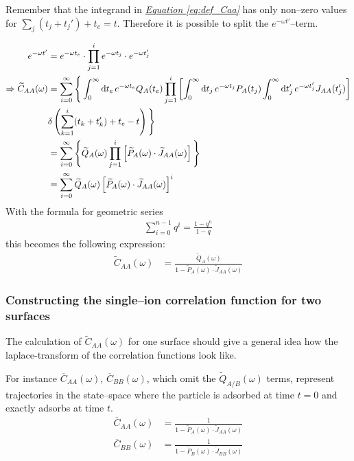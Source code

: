 \documentclass[a4paper, parskip=half]{scrartcl}
\newcommand{\diff}{\mathop{}\!\mathrm{d}}
\newcommand{\myEqRef}[1]{\textit{\hyperref[eq:#1]{Equation \ref*{eq:#1}}}}
\begin{document}
Remember that the integrand in \myEqRef{def_Caa} has only non--zero values for $\sum_{j} (t_j+t_j') + t_e = t$. Therefore it is possible to split the $e^{-\omega t'}$--term.

\begin{align}
e^{-\omega t'} &= e^{-\omega t_e} \cdot \prod_{j=1}^i e^{-\omega t_j} \cdot e^{-\omega t_j'}\\
\Rightarrow  \widetilde{C}_{AA}(\omega) &= \sum_{i=0}^\infty \Bigg\lbrace \int_0^\infty \diff t_e\, e^{-\omega t_e} Q_A(t_e) \prod_{j=1}^i \left[ \int_0^\infty \diff t_j\, e^{-\omega t_j} P_A(t_j) \int_0^\infty \diff t_j'\, e^{-\omega t_j'} J_{AA}(t_j')\right]\notag\\ 
&\delta \left(\sum_{k=1}^i(t_k+t_k') + t_e - t \right) \Bigg\rbrace\\
&= \sum_{i=0}^\infty \Bigg\lbrace \widetilde{Q}_A(\omega) \prod_{j=1}^i \left[\widetilde{P}_A(\omega) \cdot \widetilde{J}_{AA}(\omega) \right]  \Bigg\rbrace \\
&= \sum_{i=0}^\infty \widetilde{Q}_A(\omega) \left[\widetilde{P}_A(\omega) \cdot \widetilde{J}_{AA}(\omega) \right]^i
\end{align}
With the formula for geometric series 
\begin{align}
\sum_{i=0}^{n-1}q^i = \frac{1-q^n}{1-q} 
\end{align}
this becomes the following expression:
\begin{align}
\widetilde{C}_{AA}(\omega) &= \frac{\widetilde{Q}_A(\omega)}{1-\widetilde{P}_A(\omega) \cdot \widetilde{J}_{AA}(\omega)}
\end{align}
\subsubsection{Constructing the single--ion correlation function for two surfaces}
The calculation of $\widetilde{C}_{AA}(\omega)$ for one surface should give a general idea how the laplace-transform of the correlation functions look like.

For instance $\overline{C}_{AA}(\omega)$, $\overline{C}_{BB}(\omega)$, which omit the $\widetilde{Q}_{A/B}(\omega)$ terms, represent trajectories in the state--space where the particle is adsorbed at time $t=0$ and exactly adsorbs at time $t$. 
\begin{align}
\overline{C}_{AA}(\omega) &= \frac{1}{1-\widetilde{P}_A(\omega) \cdot \widetilde{J}_{AA}(\omega)} \\
\overline{C}_{BB}(\omega) &= \frac{1}{1-\widetilde{P}_B(\omega) \cdot \widetilde{J}_{BB}(\omega)} 
\end{align}
\end{document}
